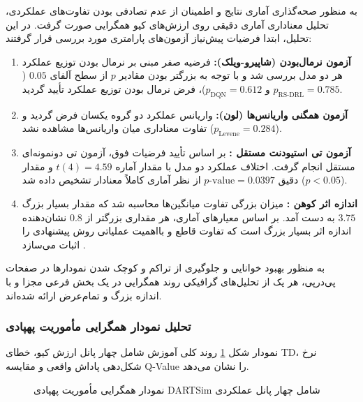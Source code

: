 \documentclass[oneside,openany,a4paper,12pt,draft]{article}
\begin{document}
به منظور صحه‌گذاری آماری نتایج و اطمینان از عدم تصادفی بودن تفاوت‌های عملکردی، تحلیل معناداری آماری دقیقی روی ارزش‌های کیو همگرایی صورت گرفت. در این تحلیل، ابتدا فرضیات پیش‌نیاز آزمون‌های پارامتری مورد بررسی قرار گرفتند:
\begin{enumerate}
    \item \textbf{آزمون نرمال‌بودن (شاپیرو-ویلک):} فرضیه صفر مبنی بر نرمال بودن توزیع عملکرد هر دو مدل بررسی شد و با توجه به بزرگتر بودن مقادیر $p$ از سطح آلفای $0.05$ ($p_{\text{RS-DRL}} = 0.785$ و $p_{\text{DQN}} = 0.612$)، فرض نرمال بودن توزیع عملکرد تأیید گردید.
    \item \textbf{آزمون همگنی واریانس‌ها (لون):} واریانس عملکرد دو گروه یکسان فرض گردید و تفاوت معناداری میان واریانس‌ها مشاهده نشد ($p_{\text{Levene}} = 0.284$).
    \item \textbf{آزمون تی استیودنت مستقل :} بر اساس تأیید فرضیات فوق، آزمون تی دونمونه‌ای مستقل انجام گرفت. اختلاف عملکرد دو مدل با مقدار آماره $t(4) = 4.59$ و مقدار دقیق $p\text{-value} = 0.0397$ از نظر آماری کاملاً معنادار تشخیص داده شد ($p < 0.05$).
    \item \textbf{اندازه اثر کوهن :} میزان بزرگی تفاوت میانگین‌ها محاسبه شد که مقدار بسیار بزرگ \textbf{$3.75$} به دست آمد. بر اساس معیارهای آماری، هر مقداری بزرگتر از $0.8$ نشان‌دهنده اندازه اثر بسیار بزرگ  است که تفاوت قاطع و بااهمیت عملیاتی روش پیشنهادی را اثبات می‌سازد .
\end{enumerate}
 

به منظور بهبود خوانایی و جلوگیری از تراکم و کوچک شدن نمودارها در صفحات پی‌در‌پی، هر یک از تحلیل‌های گرافیکی روند همگرایی در یک بخش فرعی مجزا و با اندازه بزرگ و تمام‌عرض ارائه شده‌اند.

\clearpage
\subsubsection{تحلیل نمودار همگرایی مأموریت پهپادی}
نمودار شکل \ref{fig:dartsim_convergence} روند کلی آموزش شامل چهار پانل ارزش کیو، خطای TD، نرخ شکل‌دهی پاداش واقعی و مقایسه Q-Value را نشان می‌دهد.

\begin{figure}[H]
  \centering
  \caption{نمودار همگرایی مأموریت پهپادی DARTSim شامل چهار پانل عملکردی}
  \label{fig:dartsim_convergence}
\end{figure}
\end{document}
